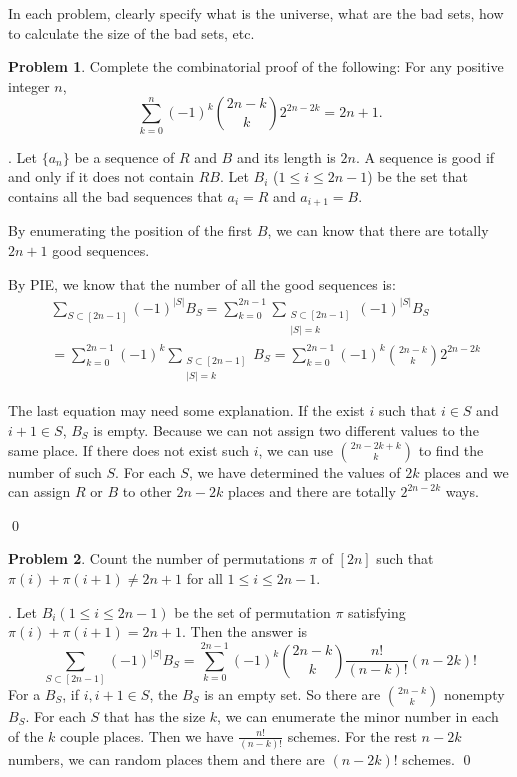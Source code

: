 \documentclass[12pt]{article}
\providecommand{\abs}[1]{\lvert#1\rvert}
\theoremstyle{definition}
\newtheorem{hw}{Problem}
\newenvironment{sol}
  {\par\vspace{3mm}\noindent{\it Solution}.}
  {\qed}
\begin{document}
In each problem, clearly specify what is the universe, what are the bad sets,
how to calculate the size of the bad sets, etc.

\begin{hw}
Complete the combinatorial proof of the following: For any positive integer
$n$,
\[
\sum_{k=0}^n(-1)^k \binom{2n-k}{k} 2^{2n-2k} = 2n+1.
\]
\end{hw}

\begin{sol}
	Let $\{a_n\}$ be a sequence of $R$ and $B$ and its length is $2n$. A sequence is good if and only if it does not contain $RB$. Let $B_i$ ($1 \leq i \leq 2n-1$) be the set that contains all the bad sequences that $a_i = R$ and $a_{i+1} = B$.
	
	By enumerating the position of the first $B$, we can know that there are totally $2n+1$ good sequences. 
	
	By PIE, we know that the number of all the good sequences is:
	\[ \begin{split}
		&   \sum_{S \subset [2n-1]}(-1)^{\abs{S}}B_{S}  
		    = \sum_{k = 0}^{2n-1}\sum_{\substack{S\subset [2n-1]\\ \abs{S}=k}} (-1)^{\abs{S}}B_{S} \\
		&   = \sum_{k = 0}^{2n-1}(-1)^k\sum_{\substack{S\subset [2n-1]\\ \abs{S}=k}}B_{S} 
		    =\sum_{k = 0}^{2n-1}(-1)^k \binom{2n-k}{k}2^{2n-2k}
	\end{split} \]
	
	The last equation may need some explanation. If the exist $i$ such that $i \in S$ and $i+1 \in S$, $B_S$ is empty. Because we can not assign two different values to the same place. If there does not exist such $i$, we can use $\binom{2n-2k + k}{k}$ to find the number of such $S$. For each $S$, we have determined the values of $2k$ places and we can assign $R$ or $B$ to other $2n-2k$ places and there are totally $2^{2n-2k}$ ways. 
	
	
\end{sol}

\begin{hw}
Count the number of permutations $\pi$ of $[2n]$ such that $\pi(i)+ \pi(i+1) \neq 2n+1$ for all $1 \leq i \leq 2n-1$.
\end{hw}

\begin{sol}
	Let $B_i (1 \leq i \leq 2n-1)$ be the set of permutation $\pi$ satisfying $\pi(i) + \pi(i+1) = 2n + 1$. Then the answer is 
	$$
		\sum_{S \subset [2n-1]}(-1)^{\abs{S}}B_S = \sum_{k = 0}^{2n-1}(-1)^k\binom{2n-k}{k}\frac{n!}{(n-k)!}(n-2k)!
	$$
	For a $B_S$, if $i,i+1 \in S$, the $B_S$ is an empty set. So there are $\binom{2n-k}{k}$ nonempty $B_S$. For each $S$ that has the size $k$, we can enumerate the minor number in each of the $k$ couple places. Then we have $\frac{n!}{(n-k)!}$ schemes. For the rest $n-2k$ numbers, we can random places them and there are $(n-2k)!$ schemes. 
\end{sol}
\end{document}
